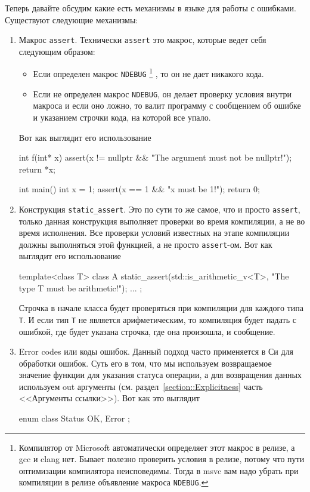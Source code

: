 Теперь давайте обсудим какие есть механизмы в языке для работы с ошибками.
Существуют следующие механизмы:
\begin{enumerate}
\item Макрос \verb"assert".
Технически \verb"assert" это макрос, которые ведет себя следующим образом:
\begin{itemize}
\item Если определен макрос \verb"NDEBUG"%
\footnote{Компилятор от Microsoft автоматически определяет этот макрос в релизе, а gcc и clang нет.
Бывает полезно проверить условия в релизе, потому что пути оптимизации компилятора неисповедимы.
Тогда в msvc вам надо убрать при компиляции в релизе объявление макроса \verb"NDEBUG".} , то он не дает никакого кода.

\item Если не определен макрос \verb"NDEBUG", он делает проверку условия внутри макроса и если оно ложно, то валит программу с сообщением об ошибке и указанием строчки кода, на которой все упало.
\end{itemize}
Вот как выглядит его использование
\begin{cppcode}
int f(int* x) {
  assert(x != nullptr && "The argument must not be nullptr!");
  return *x;
}

int main() {
  int x = 1;
  assert(x == 1 && "x must be 1!");
  return 0;
}
\end{cppcode}

\item Конструкция \verb"static_assert".
Это по сути то же самое, что и просто \verb"assert", только данная конструкция выполняет проверки во время компиляции, а не во время исполнения.
Все проверки условий известных на этапе компиляции должны выполняться этой функцией, а не просто \verb"assert"-ом.
Вот как выглядит его использование
\begin{cppcode}
template<class T>
class A {
  static_assert(std::is_arithmetic_v<T>, "The type T must be arithmetic!");
  ...
};
\end{cppcode}
Строчка в начале класса будет проверяться при компиляции для каждого типа \verb"T".
И если тип \verb"T" не является арифметическим, то компиляция будет падать с ошибкой, где будет указана строчка, где она произошла, и сообщение.

\item Error codes или коды ошибок.
Данный подход часто применяется в Си для обработки ошибок.
Суть его в том, что мы используем возвращаемое значение функции для указания статуса операции, а для возвращения данных используем out аргументы (см. раздел~\ref{section::Explicitness} часть <<Аргументы ссылки>>).
Вот как это выглядит
\begin{cppcode}
enum class Status {
  OK, Error
};


\end{cppcode}
\end{enumerate}
